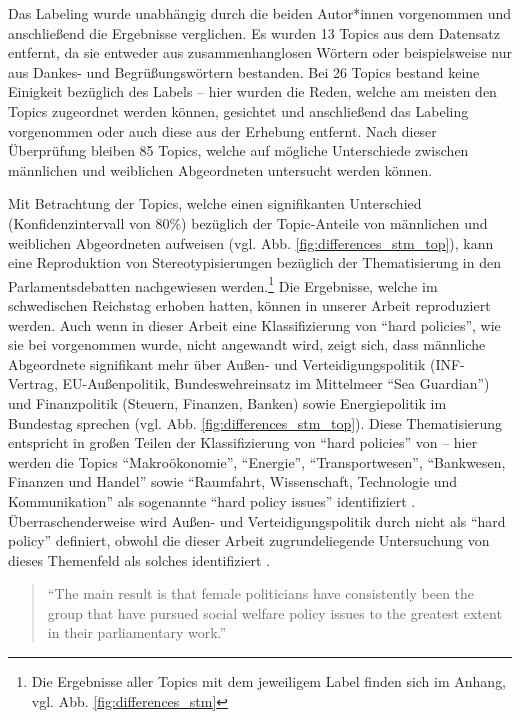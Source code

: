 \documentclass[12pt, 
    twoside=false, 
    bibliography=totoc, 
    numbers=endperiod, 
    headings=normal, 
    toc=chapterentrydotfill
    ]{scrbook}
\begin{document}
Das Labeling wurde unabhängig durch die beiden Autor*innen vorgenommen und anschließend die Ergebnisse verglichen. Es wurden 13 Topics aus dem Datensatz entfernt, da sie entweder aus zusammenhanglosen Wörtern oder beispielsweise nur aus Dankes- und Begrüßungswörtern bestanden. Bei 26 Topics bestand keine Einigkeit bezüglich des Labels -- hier wurden die Reden, welche am meisten den Topics zugeordnet werden können, gesichtet und anschließend das Labeling vorgenommen oder auch diese aus der Erhebung entfernt. Nach dieser Überprüfung bleiben 85 Topics, welche auf mögliche Unterschiede zwischen männlichen und weiblichen Abgeordneten untersucht werden können.

Mit Betrachtung der Topics, welche einen signifikanten Unterschied (Konfidenzintervall von 80\%) bezüglich der Topic-Anteile von männlichen und weiblichen Abgeordneten aufweisen (vgl. Abb. \ref{fig:differences_stm_top}), kann eine Reproduktion von Stereotypisierungen bezüglich der Thematisierung in den Parlamentsdebatten nachgewiesen werden.\footnote{Die Ergebnisse aller Topics mit dem jeweiligem Label finden sich im Anhang, vgl. Abb. \ref{fig:differences_stm}} Die Ergebnisse, welche \textcite[501ff.]{back_2014} im schwedischen Reichstag erhoben hatten, können in unserer Arbeit reproduziert werden. Auch wenn in dieser Arbeit eine Klassifizierung von \enquote{hard policies}, wie sie bei \citeauthor{back_2014} vorgenommen wurde, nicht angewandt wird, zeigt sich, dass männliche Abgeordnete signifikant mehr über Außen- und Verteidigungspolitik (INF-Vertrag, EU-Außenpolitik, Bundeswehreinsatz im Mittelmeer \enquote{Sea Guardian}) und Finanzpolitik (Steuern, Finanzen, Banken) sowie Energiepolitik im Bundestag sprechen (vgl. Abb. \ref{fig:differences_stm_top}). Diese Thematisierung entspricht in großen Teilen der Klassifizierung von \enquote{hard policies} von \citeauthor{back_2014} -- hier werden die Topics \enquote{Makroökonomie}, \enquote{Energie}, \enquote{Transportwesen}, \enquote{Bankwesen, Finanzen und Handel} sowie \enquote{Raumfahrt, Wissenschaft, Technologie und Kommunikation} als sogenannte \enquote{hard policy issues} identifiziert \parencite[510]{back_2014}. Überraschenderweise wird Außen- und Verteidigungspolitik durch \citeauthor{back_2014} nicht als \enquote{hard policy} definiert, obwohl die dieser Arbeit zugrundeliegende Untersuchung von \textcite{reynolds_1999} dieses Themenfeld als solches identifiziert \parencite[564]{reynolds_1999}.

\begin{quote}
    \enquote{The main result is that female politicians have consistently been the group that have pursued social welfare policy issues to the greatest extent in their parliamentary work.} \parencite[82]{wangnerud_2000}
\end{quote}
\end{document}
